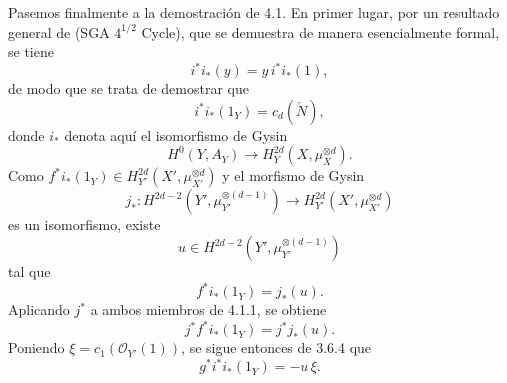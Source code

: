 Pasemos finalmente a la demostración de 4.1. En primer lugar, por un resultado general de (SGA $4^{1/2}$ Cycle), que se demuestra de manera esencialmente formal, se tiene
\[
i^*i_*(y)=y\,i^*i_*(1),
\]
de modo que se trata de demostrar que
\[
i^*i_*(1_Y)=c_d(\check N),
\]
donde $i_*$ denota aquí el isomorfismo de Gysin
\[
H^0(Y,A_Y)\to H_Y^{2d}(X,\mu_X^{\otimes d}).
\]
Como $f^*i_*(1_Y)\in H_{Y'}^{2d}(X',\mu_{X'}^{\otimes d})$ y el morfismo de Gysin
\[
j_*:H^{2d-2}(Y',\mu_{Y'}^{\otimes(d-1)})
\to H_{Y'}^{2d}(X',\mu_{X'}^{\otimes d})
\]
es un isomorfismo, existe
\[
u\in H^{2d-2}(Y',\mu_{Y'}^{\otimes(d-1)})
\]
tal que
\[
f^*i_*(1_Y)=j_*(u).
\tag{4.1.1}
\]
Aplicando $j^*$ a ambos miembros de 4.1.1, se obtiene
\[
j^*f^*i_*(1_Y)=j^*j_*(u).
\]
Poniendo $\xi=c_1(\mathcal O_{Y'}(1))$, se sigue entonces de 3.6.4 que
\[
g^*i^*i_*(1_Y)=-u\,\xi.
\tag{4.1.2}
\]
